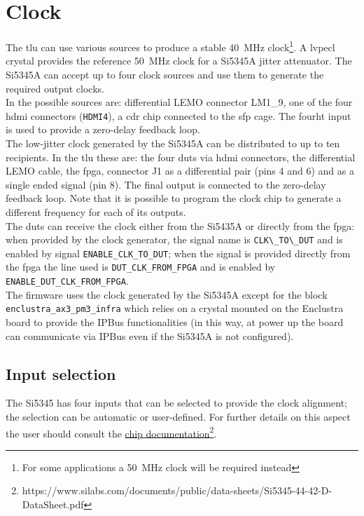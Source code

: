 \chapter{Clock}\label{ch:clock}
The \gls{tlu} can use various sources to produce a stable 40~MHz clock\footnote{For some applications a 50~MHz clock will be required instead}. A \gls{lvpecl} crystal provides the reference 50~MHz clock for a Si5345A jitter attenuator. The Si5345A can accept up to four clock sources and use them to generate the required output clocks.\\
In \brd the possible sources are: differential LEMO connector LM1\_9, one of the four \gls{hdmi} connectors (\verb|HDMI4|), a \gls{cdr} chip connected to the \gls{sfp} cage. The fourht input is used to provide a zero-delay feedback loop.\\
The low-jitter clock generated by the Si5345A can be distributed to up to ten recipients. In the \gls{tlu} these are: the four \gls{dut}s via \gls{hdmi} connectors, the differential LEMO cable, the \gls{fpga},  connector J1 as a differential pair (pins 4 and 6) and as a single ended signal (pin 8). The final output is connected to the zero-delay feedback loop. Note that it is possible to program the clock chip to generate a different frequency for each of its outputs.\\
The \gls{dut}s can receive the clock either from the Si5435A or directly from the \gls{fpga}: when provided by the clock generator, the signal name is \verb|CLK\_TO\_DUT| and is enabled by signal \verb|ENABLE_CLK_TO_DUT|; when the signal is provided directly from the \gls{fpga} the line used is \verb|DUT_CLK_FROM_FPGA| and is enabled by \verb|ENABLE_DUT_CLK_FROM_FPGA|.\\
The firmware uses the clock generated by the Si5345A except for the block \verb|enclustra_ax3_pm3_infra| which relies on a crystal mounted on the Enclustra board to provide the IPBus functionalities (in this way, at power up the board can communicate via IPBus even if the Si5345A is not configured).

\section{Input selection}
The Si5345 has four inputs that can be selected to provide the clock alignment; the selection can be automatic or user-defined. For further details on this aspect the user should consult the \href{https://www.silabs.com/documents/public/data-sheets/Si5345-44-42-D-DataSheet.pdf}{chip documentation}\footnote{https://www.silabs.com/documents/public/data-sheets/Si5345-44-42-D-DataSheet.pdf}.

